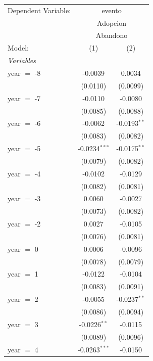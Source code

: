 
\begingroup
\centering
\begin{tabular}{lcc}
   \tabularnewline \midrule \midrule
   Dependent Variable: & \multicolumn{2}{c}{evento}\\
    & \multicolumn{2}{c}{Adopcion} \\ 
    & \multicolumn{2}{c}{Abandono} \\ 
   Model:          & (1)             & (2)\\  
   \midrule
   \emph{Variables}\\
   year $=$ -8     & -0.0039         & 0.0034\\   
                   & (0.0110)        & (0.0099)\\   
   year $=$ -7     & -0.0110         & -0.0080\\   
                   & (0.0085)        & (0.0088)\\   
   year $=$ -6     & -0.0062         & -0.0193$^{**}$\\   
                   & (0.0083)        & (0.0082)\\   
   year $=$ -5     & -0.0234$^{***}$ & -0.0175$^{**}$\\   
                   & (0.0079)        & (0.0082)\\   
   year $=$ -4     & -0.0102         & -0.0129\\   
                   & (0.0082)        & (0.0081)\\   
   year $=$ -3     & 0.0060          & -0.0027\\   
                   & (0.0073)        & (0.0082)\\   
   year $=$ -2     & 0.0027          & -0.0105\\   
                   & (0.0076)        & (0.0081)\\   
   year $=$ 0      & 0.0006          & -0.0096\\   
                   & (0.0078)        & (0.0079)\\   
   year $=$ 1      & -0.0122         & -0.0104\\   
                   & (0.0083)        & (0.0091)\\   
   year $=$ 2      & -0.0055         & -0.0237$^{**}$\\   
                   & (0.0086)        & (0.0094)\\   
   year $=$ 3      & -0.0226$^{**}$  & -0.0115\\   
                   & (0.0089)        & (0.0096)\\   
   year $=$ 4      & -0.0263$^{***}$ & -0.0150\\   

\end{tabular}
